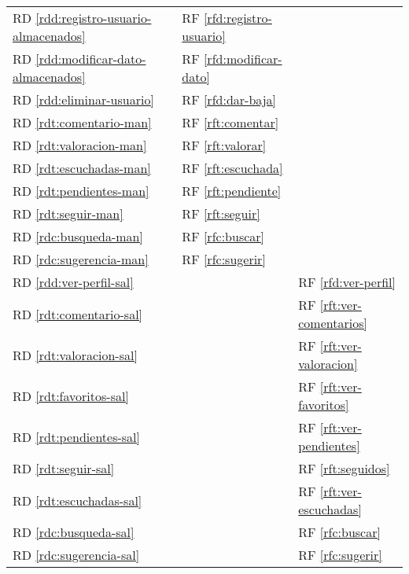 \documentclass[
  12pt,
  a4paper,
  DIV=12,
  spanish,
]{scrartcl}
\newcounter{RF}
\newcounter{RD}
\begin{document}
\begin{tabularx}{\linewidth}{l|XXX}

  RD \ref{rdd:registro-usuario-almacenados} & & RF \ref{rfd:registro-usuario} & \\
  RD \ref{rdd:modificar-dato-almacenados} & & RF \ref{rfd:modificar-dato} & \\
  RD \ref{rdd:eliminar-usuario} & & RF \ref{rfd:dar-baja} & \\
  RD \ref{rdt:comentario-man} & & RF \ref{rft:comentar} & \\
  RD \ref{rdt:valoracion-man} & & RF \ref{rft:valorar} & \\
  RD \ref{rdt:escuchadas-man} & & RF \ref{rft:escuchada} & \\
  RD \ref{rdt:pendientes-man} & & RF \ref{rft:pendiente} & \\
  RD \ref{rdt:seguir-man} & & RF \ref{rft:seguir} & \\
  RD \ref{rdc:busqueda-man} && RF \ref{rfc:buscar} & \\
  RD \ref{rdc:sugerencia-man} && RF \ref{rfc:sugerir} & \\


  RD \ref{rdd:ver-perfil-sal} & & & RF \ref{rfd:ver-perfil} \\
  RD \ref{rdt:comentario-sal} & & & RF \ref{rft:ver-comentarios} \\
  RD \ref{rdt:valoracion-sal} & & & RF \ref{rft:ver-valoracion} \\
  RD \ref{rdt:favoritos-sal} & & & RF \ref{rft:ver-favoritos} \\
  RD \ref{rdt:pendientes-sal} & & & RF \ref{rft:ver-pendientes} \\
  RD \ref{rdt:seguir-sal} & & & RF \ref{rft:seguidos} \\
  RD \ref{rdt:escuchadas-sal} & & & RF \ref{rft:ver-escuchadas} \\
  RD \ref{rdc:busqueda-sal} & & & RF \ref{rfc:buscar} \\
  RD \ref{rdc:sugerencia-sal} & & & RF \ref{rfc:sugerir} \\

\end{tabularx}
\end{document}
